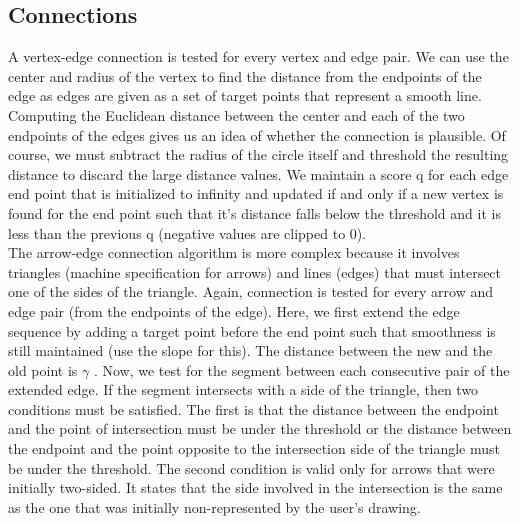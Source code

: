 \subsection{Connections}

A vertex-edge connection is tested for every vertex and edge pair. We can use the center and radius of the vertex to find the distance from the endpoints of the edge as edges are given as a set of target points that represent a smooth line. Computing the Euclidean distance between the center and each of the two endpoints of the edges gives us an idea of whether the connection is plausible. Of course, we must subtract the radius of the circle itself and threshold the resulting distance to discard the large distance values. We maintain a score q for each edge end point that is initialized to infinity and updated if and only if a new vertex is found for the end point such that it's distance falls below the threshold and it is less than the previous q (negative values are clipped to 0).\\

The arrow-edge connection algorithm is more complex because it involves triangles (machine specification for arrows) and lines (edges) that must intersect one of the sides of the triangle. Again, connection is tested for every arrow and edge pair (from the endpoints of the edge). Here, we first extend the edge sequence by adding a target point before the end point such that smoothness is still maintained (use the slope for this). The distance between the new and the old point is $\gamma$ . Now, we test for the segment between each consecutive pair of the extended edge. If the segment intersects with a side of the triangle, then two conditions must be satisfied. The first is that the distance between the endpoint and the point of intersection must be under the threshold or the distance between the endpoint and the point opposite to the intersection side of the triangle must be under the threshold. The second condition is valid only for arrows that were initially two-sided. It states that the side involved in the intersection is the same as the one that was initially non-represented by the user's drawing.\\

